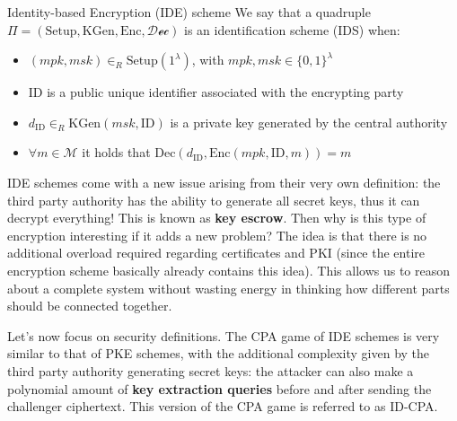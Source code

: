 \documentclass[a4paper, 12pt]{report}
\begin{document}
    \begin{frameddefn}{Identity-based Encryption (IDE) scheme}
        We say that a quadruple $\Pi = (\mathrm{Setup}, \mathrm{KGen}, \mathrm{Enc}, \mathcal{Dec})$ is an identification scheme (IDS) when:
        \begin{itemize}
            \item $(mpk,msk) \in_R \mathrm{Setup}(1^\lambda)$, with $mpk,msk \in \{0,1\}^\lambda$
            \item $\mathrm{ID}$ is a public unique identifier associated with the encrypting party
            \item $d_{\mathrm{ID}} \in_R \mathrm{KGen}(msk, \mathrm{ID})$ is a private key generated by the central authority
            \item $\forall m \in \mathcal{M}$ it holds that $\mathrm{Dec}(d_{\mathrm{ID}}, \mathrm{Enc}(mpk, \mathrm{ID}, m)) = m$
        \end{itemize}
    \end{frameddefn}

    IDE schemes come with a new issue arising from their very own definition: the third party authority has the ability to generate all secret keys, thus it can decrypt everything! This is known as \textbf{key escrow}. Then why is this type of encryption interesting if it adds a new problem? The idea is that there is no additional overload required regarding certificates and PKI (since the entire encryption scheme basically already contains this idea). This allows us to reason about a complete system without wasting energy in thinking how different parts should be connected together.

    Let's now focus on security definitions. The CPA game of IDE schemes is very similar to that of PKE schemes, with the additional complexity given by the third party authority generating secret keys: the attacker can also make a polynomial amount of \textbf{key extraction queries} before and after sending the challenger ciphertext. This version of the CPA game is referred to as ID-CPA.
\end{document}
